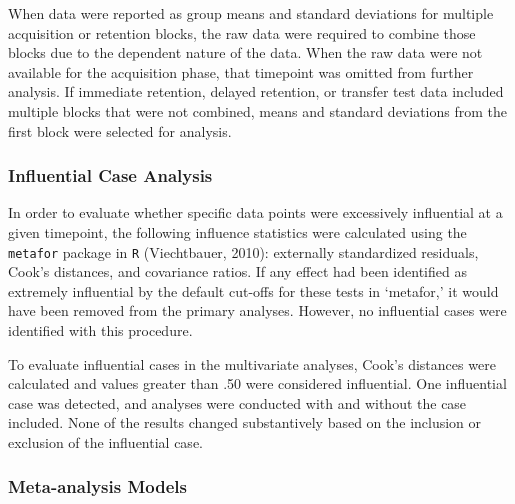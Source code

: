 \documentclass[
  english,
  man,mask,floatsintext]{apa7}
\begin{document}
When data were reported as group means and standard deviations for multiple acquisition or retention blocks, the raw data were required to combine those blocks due to the dependent nature of the data. When the raw data were not available for the acquisition phase, that timepoint was omitted from further analysis. If immediate retention, delayed retention, or transfer test data included multiple blocks that were not combined, means and standard deviations from the first block were selected for analysis.

\hypertarget{influential-case-analysis}{%
\subsubsection{Influential Case Analysis}\label{influential-case-analysis}}

In order to evaluate whether specific data points were excessively influential at a given timepoint, the following influence statistics were calculated using the \texttt{metafor} package in \texttt{R} (Viechtbauer, 2010): externally standardized residuals, Cook's distances, and covariance ratios. If any effect had been identified as extremely influential by the default cut-offs for these tests in `metafor,' it would have been removed from the primary analyses. However, no influential cases were identified with this procedure.

To evaluate influential cases in the multivariate analyses, Cook's distances were calculated and values greater than .50 were considered influential. One influential case was detected, and analyses were conducted with and without the case included. None of the results changed substantively based on the inclusion or exclusion of the influential case.

\hypertarget{meta-analysis-models}{%
\subsubsection{Meta-analysis Models}\label{meta-analysis-models}}
\end{document}
